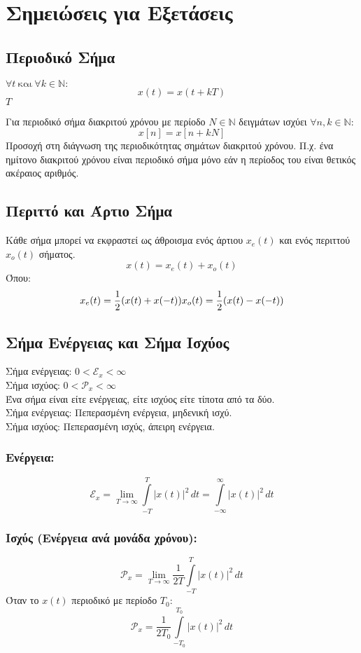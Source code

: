 \documentclass[a4paper,12pt]{article}
\begin{document}
\section*{Σημειώσεις για Εξετάσεις}

\subsection*{Περιοδικό Σήμα}
\(\forall t \ \text{και} \ \forall k \in \mathbb{N}:\)
\[
x(t)=x(t+kT)
\]
 \( T \) 

Για περιοδικό σήμα διακριτού χρόνου με περίοδο \(N \in \mathbb{N}\) δειγμάτων ισχύει \( \forall n,k \in \mathbb{N}:\)
\[
x[n]=x[n+kN]
\]
Προσοχή στη διάγνωση της περιοδικότητας σημάτων διακριτού χρόνου. Π.χ. ένα ημίτονο διακριτού χρόνου είναι περιοδικό σήμα μόνο εάν η περίοδος του είναι θετικός ακέραιος αριθμός.

\subsection*{Περιττό και Άρτιο Σήμα}
Κάθε σήμα μπορεί να εκφραστεί ως άθροισμα ενός άρτιου \(x_e(t)\) και ενός περιττού \(x_o(t)\) σήματος.
\[
x(t)=x_e(t)+x_o(t)
\]
Όπου:
\[
x_e(t)=\frac{1}{2}(x(t)+x(-t)) \\
x_o(t)=\frac{1}{2}(x(t)-x(-t))
\]

\subsection*{Σήμα Ενέργειας και Σήμα Ισχύος}
Σήμα ενέργειας: \(0<\mathcal{E}_x<\infty\)\\
Σήμα ισχύος: \(0<\mathcal{P}_x<\infty\)\\
Ένα σήμα είναι είτε ενέργειας, είτε ισχύος είτε τίποτα από τα δύο.\\
Σήμα ενέργειας: Πεπερασμένη ενέργεια, μηδενική ισχύ.\\
Σήμα ισχύος: Πεπερασμένη ισχύς, άπειρη ενέργεια.\\

\subsubsection*{Ενέργεια:}
\[
\mathcal{E}_x = \underset{T \to \infty}{\lim} \int\limits_{-T}^{T}|x(t)|^2 \, dt = \int\limits_{-\infty}^{\infty} |x(t)|^2 \, dt
\]
\subsubsection*{Ισχύς (Ενέργεια ανά μονάδα χρόνου):}
\[
\mathcal{P}_x=\underset{T \to \infty}{\lim}\frac{1}{2T}\int\limits_{-T}^{T}|x(t)|^2 \, dt
\]
Όταν το \(x(t)\) περιοδικό με περίοδο \(T_0\):
\[
\mathcal{P}_x=\frac{1}{2T_0}\int\limits_{-T_0}^{T_0}|x(t)|^2 \, dt
\]
\end{document}
